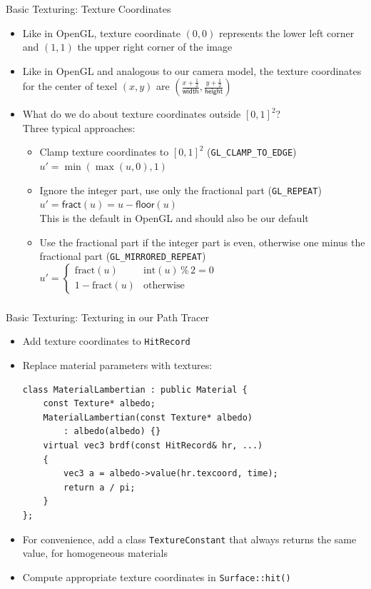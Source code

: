 \documentclass[utf8,stillsansserifmath,fleqn,t]{beamer}
\newcommand{\code}[1]{\texttt{#1}}
\begin{document}
\begin{frame}
\frametitle{\insertsection}
Basic Texturing: Texture Coordinates
\begin{itemize}
\item Like in OpenGL, texture coordinate $(0,0)$ represents the lower left
corner and $(1,1)$ the upper right corner of the image
\item Like in OpenGL and analogous to our camera model, the texture
coordinates for the center of texel $(x,y)$ are $(\frac{x+\frac{1}{2}}{\mathsf{width}},
\frac{y+\frac{1}{2}}{\mathsf{height}})$
\item What do we do about texture coordinates outside $[0,1]^2$?\\
    Three typical approaches:
    \begin{itemize}
    \item Clamp texture coordinates to $[0,1]^2$
    (\texttt{GL\_CLAMP\_TO\_EDGE})\\
        $u' = \min(\max(u,0),1)$
    \item Ignore the integer part, use only the fractional part (\texttt{GL\_REPEAT})\\
        $u' = \mathsf{fract}(u) = u - \mathsf{floor}(u)$\\
        This is the default in OpenGL and should also be our default
    \item Use the fractional part if the integer part is even, otherwise one minus the
    fractional part (\texttt{GL\_MIRRORED\_REPEAT})\\
        $u' = \begin{cases}\text{fract}(u) & \text{int}(u) \mathbin{\%} 2 = 0\\
                         1-\text{fract}(u) & \text{otherwise}\end{cases}$
    \end{itemize}
\end{itemize}
\end{frame}

\begin{frame}[fragile]
\frametitle{\insertsection}
Basic Texturing: Texturing in our Path Tracer
\begin{itemize}
\item Add texture coordinates to \code{HitRecord}
\item Replace material parameters with textures:
\begin{lstlisting}
class MaterialLambertian : public Material {
    const Texture* albedo;
    MaterialLambertian(const Texture* albedo)
        : albedo(albedo) {}
    virtual vec3 brdf(const HitRecord& hr, ...)
    {
        vec3 a = albedo->value(hr.texcoord, time);
        return a / pi;
    }
};
\end{lstlisting}
\item For convenience, add a class \texttt{TextureConstant} that always
returns the same value, for homogeneous materials
\item Compute appropriate texture coordinates in \code{Surface::hit()}
\end{itemize}
\end{frame}
\end{document}

